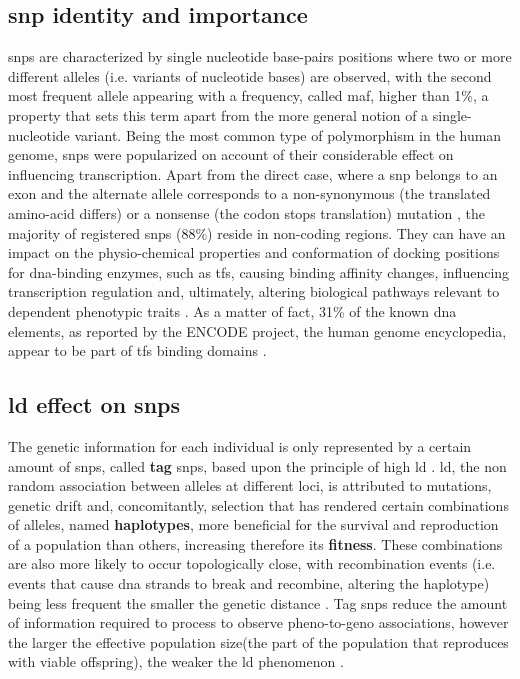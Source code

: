 \subsection{\Acf{snp} identity and importance}
\Acfp{snp} are characterized by single nucleotide base-pairs positions where two or more different alleles (i.e. variants of nucleotide bases) are observed, with the second most frequent allele appearing with a frequency, called \ac{maf}, higher than 1\%, a property that sets this term apart from the more general notion of a single-nucleotide variant. Being the most common type of polymorphism in the human genome, \acp{snp} were popularized on account of their considerable effect on influencing transcription. Apart from the direct case, where a \ac{snp} belongs to an exon and the alternate allele corresponds to a non-synonymous (the translated amino-acid differs) or a nonsense (the codon stops translation) mutation \cite{Ramensky2002}, the majority of registered \acp{snp} (88\%) reside in non-coding regions. They can have an impact on the physio-chemical properties and conformation of docking positions for \ac{dna}-binding enzymes, such as \acp{tf}, causing binding affinity changes, influencing transcription regulation and, ultimately, altering biological pathways relevant to dependent phenotypic traits \cite{Nishizaki2020}. As a matter of fact, 31\% of the known \ac{dna} elements, as reported by the ENCODE project, the human genome encyclopedia, appear to be part of \acp{tf} binding domains \cite{Dunham2012}. 

\subsection{\Acf{ld} effect on \acp{snp}}
The genetic information for each individual is only represented by a certain amount of \acfp{snp}, called \textbf{tag} \acp{snp}, based upon the principle of high \acf{ld} \cite{Visscher2012, Belmont2003}. \ac{ld}, the non random association between alleles at different loci, is attributed to mutations, genetic drift and, concomitantly, selection \cite{Visscher2012} that has rendered certain combinations of alleles, named \textbf{haplotypes}, more beneficial for the survival and reproduction of a population than others, increasing therefore its \textbf{fitness}. These combinations are also more likely to occur topologically close, with recombination events (i.e. events that cause \ac{dna} strands to break and recombine, altering the haplotype) being less frequent the smaller the genetic distance \cite{Visscher2012}. Tag \acp{snp} reduce the amount of information required to process to observe pheno-to-geno associations, however the larger the effective population size(the part of the population that reproduces with viable offspring), the weaker the \ac{ld} phenomenon \cite{Visscher2012}.

